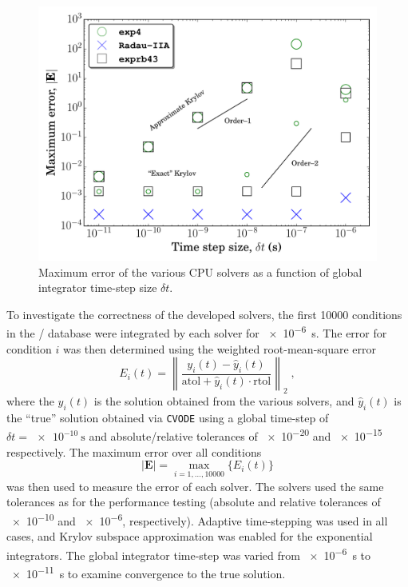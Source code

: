 \documentclass[preprint]{elsarticle}
\begin{document}
\begin{figure}[htb]
  \centering
  \includegraphics[width=0.7\linewidth]{c_nco_nosmem_error.pdf}
  \caption{Maximum error of the various CPU solvers as a function of global integrator time-step size $\delta t$.}
  \label{F:convergence}
\end{figure}

To investigate the correctness of the developed solvers, the first \num{10000} conditions in the \slash{} database were integrated by each solver for \SI{e-6}{\second}.
The error for condition $i$ was then determined using the weighted root-mean-square error
\begin{equation}
 E_i(t) = \left\lVert\frac{y_i(t) - \hat{y}_i(t)}{\text{atol} + \hat{y}_i(t) \cdot \text{rtol}}\right\rVert_2 \;,
\end{equation}
where the $y_i(t)$ is the solution obtained from the various solvers, and $\hat{y}_i(t)$ is the ``true'' solution obtained via \texttt{CVODE} using a global time-step of $\delta t = \SI{e-10}{\second}$ and absolute\slash relative tolerances of \num{e-20} and \num{e-15} respectively.
The maximum error over all conditions
\begin{equation}
 \left\lvert\textbf{E}\right\rvert = \max_{i= 1, \dots, \num{10000}}\{E_i(t)\}
\end{equation}
was then used to measure the error of each solver.
The solvers used the same tolerances as for the performance testing (absolute and relative tolerances of \num{e-10} and \num{e-6}, respectively).
Adaptive time-stepping was used in all cases, and Krylov subspace approximation was enabled for the exponential integrators.
The global integrator time-step was varied from \SI{e-6}{\second} to \SI{e-11}{\second} to examine convergence to the true solution.
\end{document}
